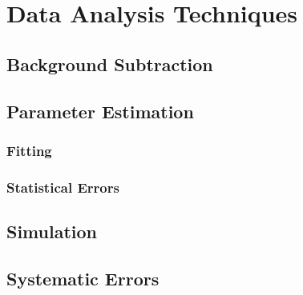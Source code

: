 \chapter{Data Analysis Techniques}
\label{chap:ana}


\section{Background Subtraction}
\label{sec:ana_bkg}
\section{Parameter Estimation}
\subsection{Fitting}
\subsection{Statistical Errors}
\section{Simulation}
\section{Systematic Errors}
